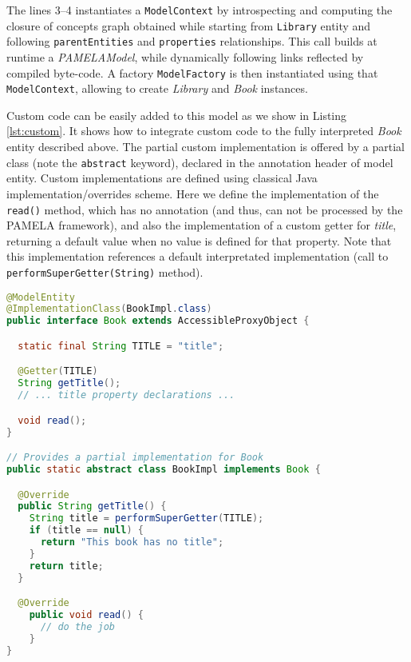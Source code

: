 The lines 3--4 instantiates a \texttt{ModelContext} by introspecting and computing the closure of concepts graph obtained while starting from \texttt{Library} entity and following \texttt{parentEntities} and \texttt{properties} relationships. This call builds at runtime a \emph{PAMELAModel}, while dynamically following links reflected by compiled byte-code. A factory \texttt{ModelFactory} is then instantiated using that \texttt{ModelContext}, allowing to create \emph{Library} and \emph{Book} instances.

Custom code can be easily added to this model as we show in Listing \ref{lst:custom}. It shows how to integrate custom code to the fully interpreted \emph{Book} entity described above. The partial custom implementation is offered by a partial class (note the \texttt{abstract} keyword), declared in the annotation header of model entity. Custom implementations are defined using classical Java implementation/overrides scheme. Here we define the implementation of the \texttt{read()} method, which has no annotation (and thus, can not be processed by the PAMELA framework), and also the implementation of a custom getter for \emph{title}, returning a default value when no value is defined for that property. Note that this implementation references a default interpretated implementation (call to \texttt{performSuperGetter(String)} method).

\begin{lstlisting}[language=Java,basicstyle=\ttfamily\footnotesize,caption=Custom Code, label=lst:custom]
@ModelEntity
@ImplementationClass(BookImpl.class)
public interface Book extends AccessibleProxyObject {

  static final String TITLE = "title";

  @Getter(TITLE)
  String getTitle();
  // ... title property declarations ...

  void read();
}

// Provides a partial implementation for Book
public static abstract class BookImpl implements Book {

  @Override
  public String getTitle() {
    String title = performSuperGetter(TITLE);
    if (title == null) {
      return "This book has no title";
    }
    return title;
  }

  @Override
    public void read() {
      // do the job
    }
}
\end{lstlisting}
